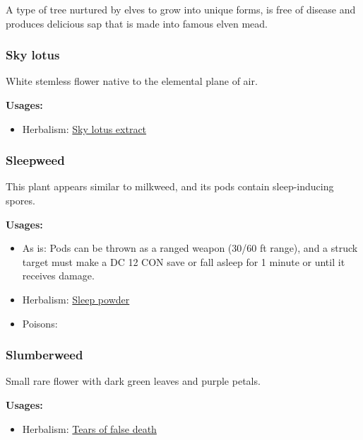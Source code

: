 A type of tree nurtured by elves to grow into unique forms, is free of disease and produces delicious sap that is made into famous elven mead.

\subsubsection{Sky lotus}
\label{Sky lotus}

White stemless flower native to the elemental plane of air.

\vspace{5mm}

\textbf{Usages:}

\begin{itemize}[noitemsep]
\item[] Herbalism: \hyperref[Sky lotus extract]{Sky lotus extract}
\end{itemize}

\subsubsection{Sleepweed}
\label{Sleepweed}

This plant appears similar to milkweed, and its pods contain sleep-inducing spores.

\vspace{5mm}

\textbf{Usages:}

\begin{itemize}[noitemsep]
\item[] As is: Pods can be thrown as a ranged weapon (30/60 ft range), and a struck target must make a DC 12 CON save or fall asleep for 1 minute or until it receives damage.
\item[] Herbalism: \hyperref[Sleep powder]{Sleep powder}
\item[] Poisons: \poison
\end{itemize}

\subsubsection{Slumberweed}
\label{Slumberweed}

Small rare flower with dark green leaves and purple petals.

\vspace{5mm}

\textbf{Usages:}

\begin{itemize}[noitemsep]
\item[] Herbalism: \hyperref[Tears of false death]{Tears of false death}
\end{itemize}

